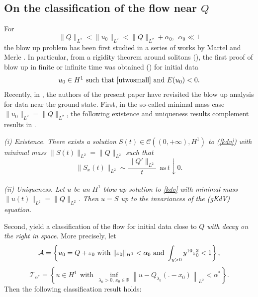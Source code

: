 \documentclass[11pt,a4paper,reqno]{amsart}
\theoremstyle{remark}
\numberwithin{equation}{section}
\newcommand{\be}{\begin{equation}}
\newcommand{\ee}{\end{equation}}
\def\RR{\mathbb{R}}
\def\fref#1{{\rm (\ref{#1})}}
\def\RR{\mathbb{R}}
\def\e{\varepsilon}
\def\fref#1{{\rm (\ref{#1})}}
\def\l{\lambda}
\begin{document}
\subsection{On the classification of the flow near $Q$}  
For 
\begin{equation}
\label{utwosmall}
\|Q\|_{L^2}<\|u_0\|_{L^2}<\|Q\|_{L^2}+\alpha_0, \ \ \alpha_0\ll1 
\end{equation}
the blow  up problem 
has been first studied in a series of works by Martel and Merle \cite{MMjmpa,MMgafa,Mjams,MMannals, MMjams}.
In particular, from a  rigidity theorem around solitons (\cite{MMjmpa}),  the first  proof of blow up in finite or infinite time was obtained (\cite{Mjams}) for 
initial data 
\be\hbox {$u_0 \in H^1$ such that \eqref{utwosmall} and  $E(u_0)<0$.}
\label{classe}
\ee 
Recently, in \cite{MMR1,MMR2},  the authors of the present paper have revisited the blow up analysis for data near the ground state. First, in the so-called minimal mass case $\|u_0\|_{L^2}= \|Q\|_{L^2}$, the following existence and uniqueness results  complement   results in \cite{MMduke}.

\medskip


{\it {\rm (i) Existence.} There exists a solution $S(t)\in \mathcal C((0,+\infty),H^1)$  to \fref{kdv} with minimal mass $\|S(t)\|_{L^2}=\|Q\|_{L^2}$ such that  
 \be\label{th1:1.4}\|  S_x(t)\|_{L^2}\sim \frac{\|Q'\|_{L^2}}{ t}\ \ \mbox{as} \  t\downarrow 0.
 \ee  \\
{\rm  (ii) Uniqueness.}
Let $u$ be an $H^1$  blow up solution to \eqref{kdv}  with minimal mass $\|u(t)\|_{L^2} = \|Q\|_{L^2}$. Then $u=S$ up to the invariances of the (gKdV) equation.}


\medskip

Second,    \cite{MMR1,MMR2} yield a classification of the flow for initial data close to $Q$ {\it with decay on the right  in space}. More precisely, let
$$
\mathcal{A}=
\left\{
u_0=Q+\e_0   \hbox{ with } \|\e_0\|_{H^1}<\alpha_0 \hbox{ and }
\int_{y>0} y^{10}\e_0^2< 1
\right\},
$$
$$\mathcal T_{\alpha^*}=\left\{u\in H^1\ \ \mbox{with}\ \ \inf_{\l_0>0, \, x_0\in \RR}
\left\|u- Q_{\l_0}\left( .-x_0 \right) \right\|_{L^2} <\alpha^*\right\}.$$
Then the following classification  result holds: 


 

\medskip
\end{document}

